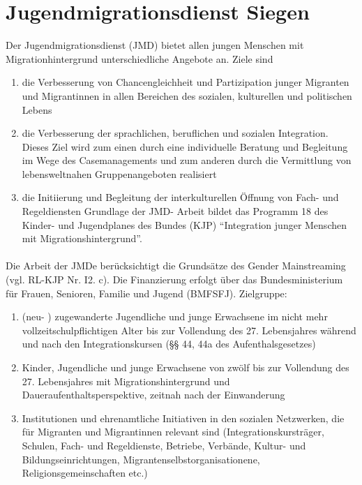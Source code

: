 \section{Jugendmigrationsdienst Siegen}
Der Jugendmigrationsdienst (JMD) bietet allen jungen Menschen mit Migrationhintergrund unterschiedliche Angebote an. Ziele sind \\
\begin{enumerate}
	\item die Verbesserung von Chancengleichheit und Partizipation junger Migranten und Migrantinnen in allen Bereichen des sozialen, kulturellen und politischen Lebens
	\item die Verbesserung der sprachlichen, beruflichen und sozialen Integration. Dieses Ziel wird zum einen durch eine individuelle Beratung und Begleitung im Wege des Casemanagements und zum anderen durch die Vermittlung von lebensweltnahen Gruppenangeboten realisiert
	\item die Initiierung und Begleitung der interkulturellen Öffnung von Fach- und Regeldiensten
	Grundlage der JMD- Arbeit bildet das Programm 18 des Kinder- und Jugendplanes des Bundes (KJP) \enquote{Integration junger Menschen mit Migrationshintergrund}.
\end{enumerate}

\paragraph{} Die Arbeit der JMDe berücksichtigt die Grundsätze des Gender Mainstreaming (vgl. RL-KJP Nr. I2. c). Die Finanzierung erfolgt über das Bundesministerium für Frauen, Senioren, Familie und Jugend (BMFSFJ). Zielgruppe:\\

\begin{enumerate}
	\item (neu- ) zugewanderte Jugendliche und junge Erwachsene im nicht mehr vollzeitschulpflichtigen Alter bis zur Vollendung des 27. Lebensjahres während und nach den Integrationskursen (§§ 44, 44a des Aufenthalsgesetzes)
	\item Kinder, Jugendliche und junge Erwachsene von zwölf bis zur Vollendung des 27. Lebensjahres mit Migrationshintergrund und Daueraufenthaltsperspektive, zeitnah nach der Einwanderung
	\item Institutionen und ehrenamtliche Initiativen in den sozialen Netzwerken, die für Migranten und Migrantinnen relevant sind (Integrationskursträger, Schulen, Fach- und Regeldienste, Betriebe, Verbände, Kultur- und Bildungseinrichtungen, Migrantenselbstorganisationene, Religionsgemeinschaften etc.) 
\end{enumerate}
